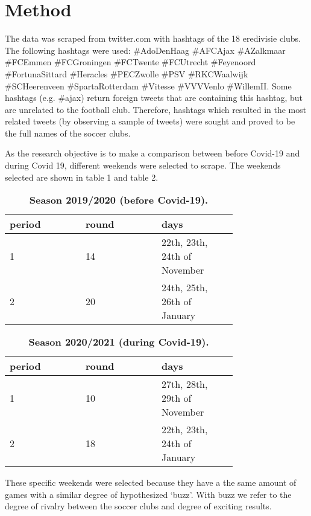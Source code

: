 \documentclass[12pt]{article}
\begin{document}
\section{Method}
The data was scraped from twitter.com with hashtags of the 18 eredivisie clubs.  The following hashtags were used: \#AdoDenHaag \#AFCAjax \#AZalkmaar \#FCEmmen \#FCGroningen \#FCTwente \#FCUtrecht \#Feyenoord \#FortunaSittard \#Heracles \#PECZwolle \#PSV \#RKCWaalwijk \#SCHeerenveen \#SpartaRotterdam \#Vitesse \#VVVVenlo \#WillemII. Some hashtags (e.g. \#ajax) return foreign tweets that are containing this hashtag, but are unrelated to the football club. Therefore, hashtags which resulted in the most related tweets (by observing a sample of tweets) were sought and proved to be the full names of the soccer clubs.

As the research objective is to make a comparison between before Covid-19 and during Covid 19, different weekends were selected to scrape. The weekends selected are shown in table 1 and table 2.

\begin{table*}[ht]
\caption{\textbf{Season 2019/2020 (before Covid-19).}}
\centering
\begin{tabular}{p{0.25\linewidth}p{0.25\linewidth}p{0.25\linewidth}}
\hline
period & round  & days\\
\hline
1 & 14  & 22th, 23th, 24th of November\\
2 & 20 & 24th, 25th, 26th of January\\
\hline
\end{tabular}
\end{table*}

\begin{table*}[ht]
\caption{\textbf{Season 2020/2021 (during Covid-19).}}
\centering
\begin{tabular}{p{0.25\linewidth}p{0.25\linewidth}p{0.25\linewidth}}
\hline
period & round  & days\\
\hline
1 & 10  & 27th, 28th, 29th of November\\
2 & 18 & 22th, 23th, 24th of January\\
\hline
\end{tabular}
\end{table*}

These specific weekends were selected because they have a the same amount of games with a similar degree of hypothesized ‘buzz’. With buzz we refer to the degree of rivalry between the soccer clubs and degree of exciting results.
\end{document}
